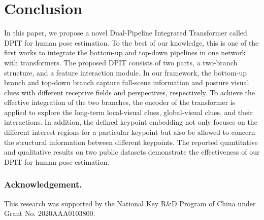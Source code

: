 \documentclass[runningheads]{llncs}
\begin{document}
\section{Conclusion} \label{sec:Conclusion}
In this paper, we propose a novel Dual-Pipeline Integrated Transformer called DPIT for human pose estimation. To the best of our knowledge, this is one of the first works to integrate the bottom-up and top-down pipelines in one network with transformers. The proposed DPIT consists of two parts, a two-branch structure, and a feature interaction module. In our framework, the bottom-up branch and top-down branch capture full-scene information and posture visual clues with different receptive fields and perspectives, respectively. To achieve the effective integration of the two branches, the encoder of the transformer is applied to explore the long-term local-visual clues, global-visual clues, and their interactions. In addition, the defined keypoint embedding not only focuses on the different interest regions for a particular keypoint but also be allowed to concern the structural information between different keypoints. The reported quantitative and qualitative results on two public datasets demonstrate the effectiveness of our DPIT for human pose estimation.

\subsubsection{Acknowledgement.}
This research was supported by the National Key R\&D Program of China under Grant No. 2020AAA0103800.
\end{document}
